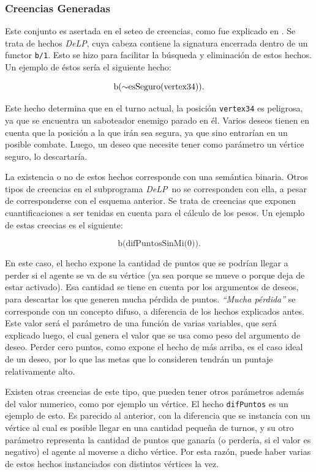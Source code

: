 \documentclass[oneside]{book}
\theoremstyle{definition}
\newcommand{\DLP}{\mbox{\textit{DeLP}}}
\newcommand{\no}{\mbox{$\sim$}}
\newcommand{\nlA}[1]{$$\mbox{#1}$$}
\begin{document}
\subsubsection{Creencias Generadas}

Este conjunto es asertada en el seteo de creencias, como fue explicado en %
. Se trata de hechos \DLP, cuya cabeza contiene la signatura encerrada dentro
de un functor \texttt{b/1}. Esto se hizo para facilitar la búsqueda y eliminación de
estos hechos. Un ejemplo de éstos sería el siguiente hecho:

\nlA{b(\no esSeguro(vertex34)).}

Este hecho determina que en el turno actual, la posición \texttt{vertex34} es peligrosa,
ya que se encuentra un saboteador enemigo parado en él. Varios deseos tienen en cuenta
que la posición a la que irán sea segura, ya que sino entrarían en un posible combate.
Luego, un deseo que necesite tener como parámetro un vértice seguro, lo descartaría.

La existencia o no de estos hechos corresponde con una semántica binaria. Otros tipos de
creencias en el subprograma \DLP\ no se corresponden con ella, a pesar de corresponderse
con el esquema anterior. Se trata de creencias que exponen cuantificaciones a ser 
tenidas en cuenta para el cálculo de los pesos. Un ejemplo de estas creecias es el 
siguiente:

\nlA{b(difPuntosSinMi(0)).}

En este caso, el hecho expone la cantidad de puntos que se podrían llegar a perder si el
agente se va de su vértice (ya sea porque se mueve o porque deja de estar activado). Esa
cantidad se tiene en cuenta por los argumentos de deseos, para descartar los que generen
mucha pérdida de puntos. \textit{``Mucha pérdida''} se corresponde con un 
concepto difuso, a diferencia de los hechos explicados antes. Este valor será 
el parámetro de una función de varias variables, que será explicado luego, el 
cual genera el valor que se usa como peso del argumento de deseo. Perder cero 
puntos, como expone el hecho de más arriba, es el caso ideal de un deseo, por 
lo que las metas que lo consideren tendrán un puntaje relativamente alto.

Existen otras creencias de este tipo, que pueden tener otros parámetros además del valor
numerico, como por ejemplo un vértice. El hecho \texttt{difPuntos} es un ejemplo de esto.
Es parecido al anterior, con la diferencia que se instancia con un vértice al cual es
posible llegar en una cantidad pequeña de turnos, y su otro parámetro representa la
cantidad de puntos que ganaría (o perdería, si el valor es negativo) el agente al moverse
a dicho vértice. Por esta razón, puede haber varias de estos hechos instanciados con
distintos vértices la vez.
\end{document}
